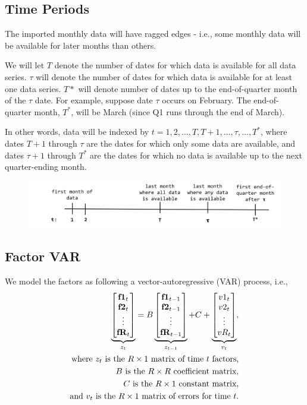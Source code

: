 \documentclass[11pt, letterpaper]{article}
\newcommand{\vv}[1]{\textcolor{black}{\mathbf{#1}}}
\begin{document}
\subsection{Time Periods}
The imported monthly data will have ragged edges - i.e., some monthly data will be available for later months than others.

We will let $T$ denote the number of dates for which data is available for all data series. $\tau$ will denote the number of dates for which data is available for at least one data series. $T*$ will denote number of dates up to the end-of-quarter month of the $\tau$ date. For example, suppose date $\tau$ occurs on February. The end-of-quarter month, $T^*$, will be March (since Q1 runs through the end of March). 

In other words, data will be indexed by $t = 1, 2, \dots, T, T+1, \dots, \tau, \dots, T^*$, where dates $T + 1$ through $\tau$ are the dates for which only some data are available, and dates $\tau + 1$ through $T^*$ are the dates for which no data is available up to the next quarter-ending month.
\begin{figure}[H]
\includegraphics[scale=.7]{nowcast-time}
\centering
\end{figure}
\subsection{Factor VAR}

We model the factors as following a vector-autoregressive (VAR) process, i.e., 
\begin{align*}
\underbrace{\begin{bmatrix}
	\vv{f1}_{t}\\
	\vv{f2}_{t}\\
	\vdots \\
	\vv{fR}_{t}
\end{bmatrix}}_{z_t}
=
B
\underbrace{\begin{bmatrix}
	\vv{f1}_{t-1}\\
	\vv{f2}_{t-1}\\
	\vdots \\
	\vv{fR}_{t-1}
\end{bmatrix}}_{z_{t-1}}
+
C
+
\underbrace{\begin{bmatrix}
v1_t\\
v2_t\\
\vdots\\
vR_t
\end{bmatrix}}_{v_t},\\
\text{where $z_t$ is the $R \times 1$ matrix of time $t$ factors,}\\
\text{$B$ is the $R \times R$ coefficient matrix,}\\
\text{$C$ is the $R \times 1$ constant matrix,}\\
\text{and $v_t$ is the $R \times 1$ matrix of errors for time $t$.}
\end{align*}
\end{document}
